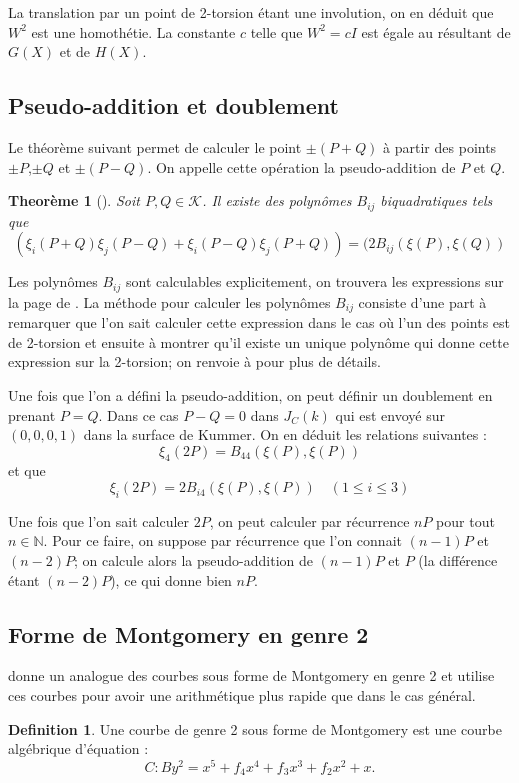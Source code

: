 \documentclass[a4paper]{article}
\newtheorem{theoreme}{Theorème}[section]
\theoremstyle{definition}
\newtheorem{definition}{Definition}[section]
\theoremstyle{remark}
\numberwithin{equation}{section}
\begin{document}
La translation par un point de 2-torsion étant une involution, on en déduit que $W^2$ est une homothétie. La constante $c$ telle que $W^2 = cI$ est égale au résultant de $G(X)$ et de $H(X)$.
\subsection{Pseudo-addition et doublement}
Le théorème suivant permet de calculer le point $\pm (P+Q)$ à partir des points $\pm P$,$\pm Q$ et $\pm(P-Q)$. On appelle cette opération la pseudo-addition de $P$ et $Q$.

\begin{theoreme}[\citet{cassels-Flynn}]
Soit $P,Q \in \mathcal{K}$. Il existe des polynômes $B_{ij}$ biquadratiques tels que
$$(\xi_i(P+Q)\xi_j(P-Q) + \xi_i(P-Q)\xi_j(P+Q)) = (2B_{ij}(\xi(P),\xi(Q))$$
\end{theoreme}

Les polynômes $B_{ij}$ sont calculables explicitement, on trouvera les expressions sur la page de \citet{biquad}. La méthode pour calculer les polynômes $B_{ij}$ consiste d'une part à remarquer que l'on sait calculer cette expression dans le cas où l'un des points est de 2-torsion et ensuite à montrer qu'il existe un unique polynôme qui donne cette expression sur la 2-torsion; on renvoie à \citet{cassels-Flynn} pour plus de détails.

Une fois que l'on a défini la pseudo-addition, on peut définir un doublement en prenant $P=Q$. Dans ce cas $P-Q = 0$ dans $J_C(k)$ qui est envoyé sur $(0,0,0,1)$ dans la surface de Kummer. On en déduit les relations suivantes :
$$\xi_4(2P) = B_{44}(\xi(P),\xi(P))$$
et que
$$\xi_i(2P) = 2B_{i4}(\xi(P),\xi(P)) \quad (1\leq i \leq 3)$$

Une fois que l'on sait calculer $2P$, on peut calculer par récurrence $nP$ pour tout $n\in\mathbb{N}$. Pour ce faire, on suppose par récurrence que l'on connait $(n-1)P$ et $(n-2)P$; on calcule alors la pseudo-addition de $(n-1)P$ et $P$ (la différence étant $(n-2)P$), ce qui donne bien $nP$.

\subsection{Forme de Montgomery en genre 2}
\citet{duquesne} donne un analogue des courbes sous forme de Montgomery en genre 2 et utilise ces courbes pour avoir une arithmétique plus rapide que dans le cas général.

\begin{definition}
Une courbe de genre 2 sous forme de Montgomery est une courbe algébrique d'équation :
$$C : By^2 = x^5 + f_4x^4 + f_3x^3 + f_2x^2 + x.$$
\end{definition}
\end{document}
